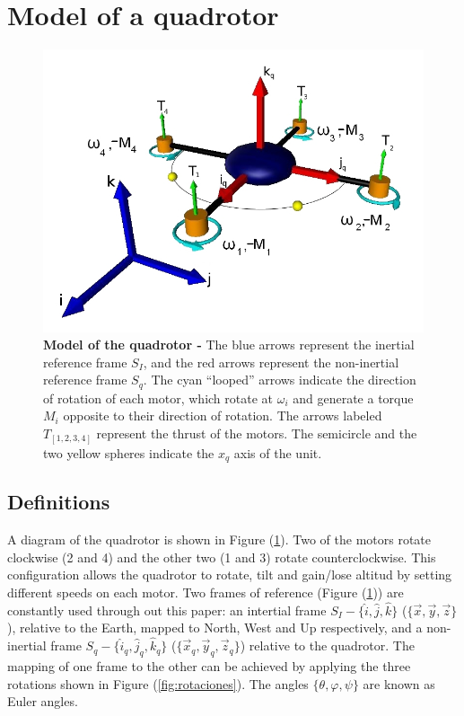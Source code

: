 \documentclass[conference]{IEEEtran}
\newcommand{\refp}[1]{(\ref{#1})}
\begin{document}
\section{Model of a quadrotor}
\label{sec:modelo}
\begin{figure}
	\centering
	\includegraphics[width=.7\columnwidth]{./pics_paper/quad_coord.jpg}
	\vspace{-5pt}
	\caption{\textbf{Model of the quadrotor -} The blue arrows represent the inertial reference frame $S_I$, and the red arrows represent the non-inertial reference frame $S_q$. The cyan ``looped'' arrows indicate the direction of rotation of each motor, which rotate at $\omega_i$ and generate a torque $M_i$ opposite to their direction of rotation. The arrows labeled $T_{[1,2,3,4]}$ represent the thrust of the motors. The semicircle and the two yellow spheres indicate the $x_q$ axis of the unit.}
	\label{fig:quad}
\end{figure}

\subsection{Definitions}
\label{sec:modelo-defs}
A diagram of the quadrotor is shown in Figure \refp{fig:quad}. Two of the motors rotate clockwise (2 and 4) and the other two (1 and 3) rotate counterclockwise. This configuration allows the quadrotor to rotate, tilt and gain/lose altitud by setting different speeds on each motor. Two frames of reference (Figure \refp{fig:quad}) are constantly used through out this paper: an intertial frame $S_I - \lbrace \hat{i},\hat{j},\hat{k}\rbrace$ ($\lbrace \vec{x},\vec{y},\vec{z}\rbrace$), relative to the Earth, mapped to  North, West and Up respectively, and a non-inertial frame $S_q - \lbrace \hat{i}_q,\hat{j}_q,\hat{k}_q\rbrace$ ($\lbrace \vec{x}_q,\vec{y}_q,\vec{z}_q\rbrace$) relative to the quadrotor. The mapping of one frame to the other can be achieved by applying the three rotations shown in Figure \refp{fig:rotaciones}. The angles $\lbrace \theta, \varphi, \psi\rbrace$ are known as Euler angles.
\end{document}
